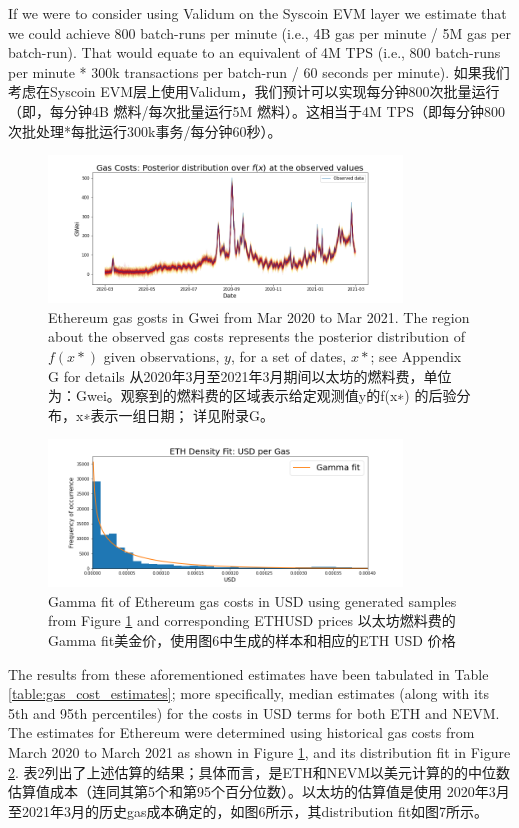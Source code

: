 \documentclass{ctexart}
\begin{document}
If we were to consider using Validum on the Syscoin EVM layer we estimate that we could achieve 800 batch-runs per minute (i.e., 4B gas per minute / 5M gas per batch-run). That would equate to an equivalent of 4M TPS (i.e., 800 batch-runs per minute * 300k transactions per batch-run / 60 seconds per minute). 如果我们考虑在Syscoin EVM层上使用Validum，我们预计可以实现每分钟800次批量运行（即，每分钟4B 燃料/每次批量运行5M 燃料）。这相当于4M TPS（即每分钟800次批处理*每批运行300k事务/每分钟60秒）。

\begin{figure}[h!]
\centering
\includegraphics[width=3.7in]{img/eth_gas_costs.png}
\caption{Ethereum gas gosts in Gwei from Mar 2020 to Mar 2021. The region about the observed gas costs represents the posterior distribution of $f(x*)$ given observations, $y$, for a set of dates, $x*$; see Appendix G for details 从2020年3月至2021年3月期间以太坊的燃料费，单位为：Gwei。观察到的燃料费的区域表示给定观测值y的f(x∗) 的后验分布，x∗表示一组日期； 详见附录G。}  
\label{fig:eth_gas_costs}
\end{figure} 

\begin{figure}[h!]
\centering
\includegraphics[width=3.7in]{img/eth_usd_density.png}
\caption{Gamma fit of Ethereum gas costs in USD using generated samples from Figure \ref{fig:eth_gas_costs} and corresponding ETHUSD prices 以太坊燃料费的Gamma fit美金价，使用图6中生成的样本和相应的ETH USD 价格} 
\label{fig:eth_usd_density}
\end{figure} 

The results from these aforementioned estimates have been tabulated in Table \ref{table:gas_cost_estimates}; more specifically, median estimates (along with its 5th and 95th percentiles) for the costs in USD terms for both ETH and NEVM. The estimates for Ethereum were determined using historical gas costs from March 2020 to March 2021 as shown in Figure \ref{fig:eth_gas_costs}, and its distribution fit in Figure \ref{fig:eth_usd_density}. 表2列出了上述估算的结果；具体而言，是ETH和NEVM以美元计算的的中位数估算值成本（连同其第5个和第95个百分位数）。以太坊的估算值是使用 2020年3月至2021年3月的历史gas成本确定的，如图6所示，其distribution fit如图7所示。
\end{document}
